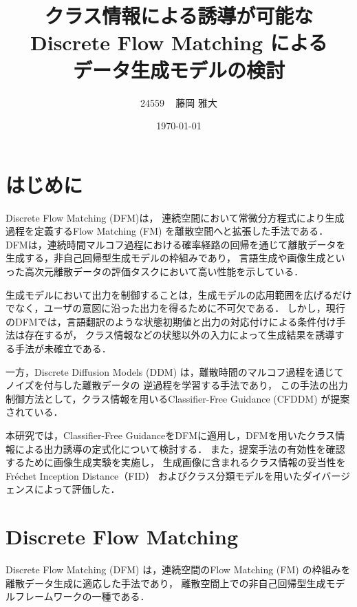 \documentclass[11pt]{jsarticle}  %
\begin{document}
\title{
クラス情報による誘導が可能な Discrete Flow Matching による\\データ生成モデルの検討}

\date{\large \today}
\author{
  \large 24559 ~ 藤岡 雅大
}

\maketitle
\section{はじめに}
Discrete Flow Matching\cite{DFM} (DFM)は，
連続空間において常微分方程式により生成過程を定義するFlow Matching\cite{FMGM} (FM) を離散空間へと拡張した手法である．
DFMは，連続時間マルコフ過程における確率経路の回帰を通じて離散データを生成する，非自己回帰型生成モデルの枠組みであり，
言語生成や画像生成といった高次元離散データの評価タスクにおいて高い性能を示している．

生成モデルにおいて出力を制御することは，生成モデルの応用範囲を広げるだけでなく，ユーザの意図に沿った出力を得るために不可欠である．
しかし，現行のDFMでは，言語翻訳のような状態初期値と出力の対応付けによる条件付け手法は存在するが，
クラス情報などの状態以外の入力によって生成結果を誘導する手法が未確立である．

一方，Discrete Diffusion Models\cite{DDM} (DDM) は，離散時間のマルコフ過程を通じてノイズを付与した離散データの
逆過程を学習する手法であり，
この手法の出力制御方法として，クラス情報を用いるClassifier-Free Guidance\cite{CFDDM} (CFDDM) が提案されている．

本研究では，Classifier-Free GuidanceをDFMに適用し，DFMを用いたクラス情報による出力誘導の定式化について検討する．
また，提案手法の有効性を確認するために画像生成実験を実施し，
生成画像に含まれるクラス情報の妥当性をFréchet Inception Distance\cite{FID}（FID）
およびクラス分類モデルを用いたダイバージェンスによって評価した．


\section{Discrete Flow Matching\cite{DFM}}
\label{sec:dfm}
Discrete Flow Matching (DFM) は，連続空間のFlow Matching (FM) の枠組みを離散データ生成に適応した手法であり，
離散空間上での非自己回帰型生成モデルフレームワークの一種である．
\end{document}
